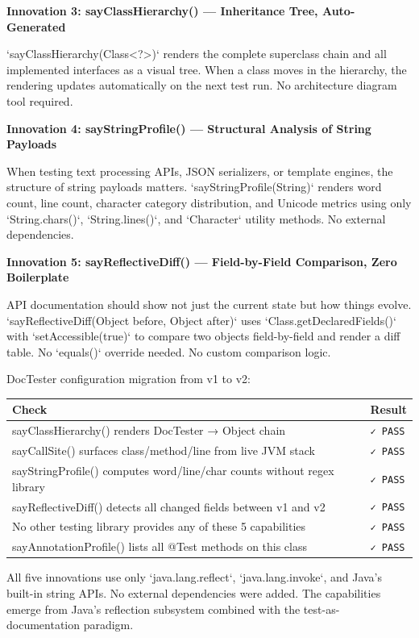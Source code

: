 \documentclass[11pt]{article}
\begin{document}
\textbf{Innovation 3: sayClassHierarchy() — Inheritance Tree, Auto-Generated}

`sayClassHierarchy(Class<?>)` renders the complete superclass chain and all implemented interfaces as a visual tree. When a class moves in the hierarchy, the rendering updates automatically on the next test run. No architecture diagram tool required.

\textbf{Innovation 4: sayStringProfile() — Structural Analysis of String Payloads}

When testing text processing APIs, JSON serializers, or template engines, the structure of string payloads matters. `sayStringProfile(String)` renders word count, line count, character category distribution, and Unicode metrics using only `String.chars()`, `String.lines()`, and `Character` utility methods. No external dependencies.

\textbf{Innovation 5: sayReflectiveDiff() — Field-by-Field Comparison, Zero Boilerplate}

API documentation should show not just the current state but how things evolve. `sayReflectiveDiff(Object before, Object after)` uses `Class.getDeclaredFields()` with `setAccessible(true)` to compare two objects field-by-field and render a diff table. No `equals()` override needed. No custom comparison logic.

DocTester configuration migration from v1 to v2:

\begin{table}[h]
\centering
\begin{tabular}{|l|l|}
\hline
\textbf{Check} & \textbf{Result} \\
\hline
sayClassHierarchy() renders DocTester → Object chain & \texttt{✓ PASS} \\
sayCallSite() surfaces class/method/line from live JVM stack & \texttt{✓ PASS} \\
sayStringProfile() computes word/line/char counts without regex library & \texttt{✓ PASS} \\
sayReflectiveDiff() detects all changed fields between v1 and v2 & \texttt{✓ PASS} \\
No other testing library provides any of these 5 capabilities & \texttt{✓ PASS} \\
sayAnnotationProfile() lists all @Test methods on this class & \texttt{✓ PASS} \\
\hline
\end{tabular}
\end{table}


\begin{tcolorbox}[colback=notebg,colframe=blue!50!black,title={\textbf{Note}}]
All five innovations use only `java.lang.reflect`, `java.lang.invoke`, and Java's built-in string APIs. No external dependencies were added. The capabilities emerge from Java's reflection subsystem combined with the test-as-documentation paradigm.
\end{tcolorbox}
\end{document}
